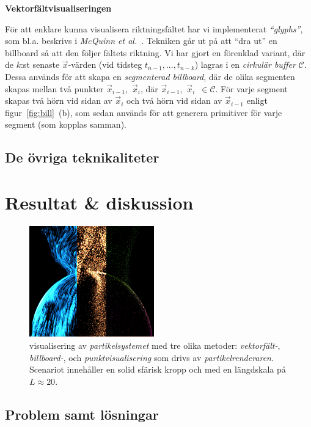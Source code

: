 \documentclass[a4paper]{article}
\begin{document}
\begin{multicols}{2}
\textbf{Vektorfältvisualiseringen}

För att enklare kunna visualisera riktningsfältet har vi implementerat \emph{``glyphs''}, som bl.a. beskrivs i \emph{McQuinn et al.}~\cite{mcquinn2013glyphsea}. Tekniken går ut på att ``dra ut'' en billboard så att den följer fältets riktning. Vi har gjort en förenklad variant, där de \(k\):st senaste \(\vec{x}\)-värden (vid tidsteg \(t_{n-1}, ..., t_{n-k}\)) lagras i en \emph{cirkulär buffer} \(\mathcal{C}\). Dessa används för att skapa en \emph{segmenterad billboard}, där de olika segmenten skapas mellan två punkter \(\vec{x}_{i-1}\),~\(\vec{x}_i\), där \(\vec{x}_{i-1}\),~\(\vec{x}_i\)~\(\in \mathcal{C}\). För varje segment skapas två hörn vid sidan av \(\vec{x}_i\) och två hörn vid sidan av \(\vec{x}_{i-1}\) enligt figur~\ref{fig:bill}~(b), som sedan används för att generera primitiver för varje segment (som kopplas samman).

\subsection{De övriga teknikaliteter}

\clearpage

\section{Resultat \& diskussion} \label{sec:results}

\begin{figure}[H]
\center
\includegraphics[width=0.48\textwidth]{share/merged_shaders.png}
    \caption{visualisering av \emph{partikelsystemet} med tre olika metoder: \emph{vektorfält-}, \emph{billboard-}, och \emph{punktvisualisering} som drivs av \emph{partikelrenderaren}. Scenariot innehåller en solid sfärisk kropp och med en längdskala på \(L\approx20\).}
\label{fig:verysexy}
\end{figure}

        \subsection{Problem samt lösningar}


\end{multicols}
\end{document}
